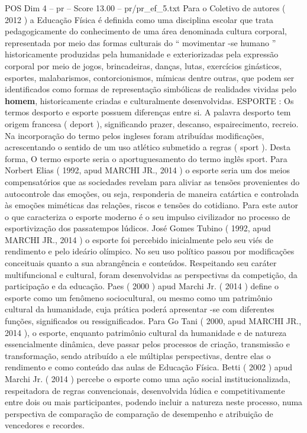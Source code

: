 \begin{textsample}{POS Dim 4 – pr – Score 13.00 – pr/pr\_ef\_5.txt}
Para o Coletivo de autores ( 2012 ) a Educação Física é definida como uma disciplina escolar que trata pedagogicamente do conhecimento de uma área denominada cultura corporal, representada por meio das formas culturais do “ movimentar -se humano ” historicamente produzidas pela humanidade e exteriorizadas pela expressão corporal por meio de jogos, brincadeiras, danças, lutas, exercícios ginásticos, esportes, malabarismos, contorcionismos, mímicas dentre outras, que podem ser identificados como formas de representação simbólicas de realidades vividas pelo \textbf{homem}, historicamente criadas e culturalmente desenvolvidas.
ESPORTE : Os termos desporto e esporte possuem diferenças entre si.
A palavra desporto tem origem francesa ( deport ), significando prazer, descanso, espairecimento, recreio.
Na incorporação do termo pelos ingleses foram atribuídas modificações, acrescentando o sentido de um uso atlético submetido a regras ( sport ).
Desta forma, O termo esporte seria o aportuguesamento do termo inglês sport.
Para Norbert Elias ( 1992, apud MARCHI JR., 2014 ) o esporte seria um dos meios compensatórios que as sociedades revelam para aliviar as tensões provenientes do autocontrole das emoções, ou seja, responderia de maneira catártica e controlada às emoções miméticas das relações, riscos e tensões do cotidiano.
Para este autor o que caracteriza o esporte moderno é o seu impulso civilizador no processo de esportivização dos passatempos lúdicos.
José Gomes Tubino ( 1992, apud MARCHI JR., 2014 ) o esporte foi percebido inicialmente pelo seu viés de rendimento e pelo ideário olímpico.
No seu uso político passou por modificações conceituais quanto a sua abrangência e conteúdos.
Respeitando seu caráter multifuncional e cultural, foram desenvolvidas as perspectivas da competição, da participação e da educação.
Paes ( 2000 ) apud Marchi Jr. ( 2014 ) define o esporte como um fenômeno sociocultural, ou mesmo como um patrimônio cultural da humanidade, cuja prática poderá apresentar -se com diferentes funções, significados ou ressignificados.
Para Go Tani ( 2000, apud MARCHI JR., 2014 ), o esporte, enquanto patrimônio cultural da humanidade e de natureza essencialmente dinâmica, deve passar pelos processos de criação, transmissão e transformação, sendo atribuído a ele múltiplas perspectivas, dentre elas o rendimento e como conteúdo das aulas de Educação Física.
Betti ( 2002 ) apud Marchi Jr. ( 2014 ) percebe o esporte como uma ação social institucionalizada, respeitadora de regras convencionais, desenvolvida lúdica e competitivamente entre dois ou mais participantes, podendo incluir a natureza neste processo, numa perspectiva de comparação de comparação de desempenho e atribuição de vencedores e recordes.

\end{textsample}
